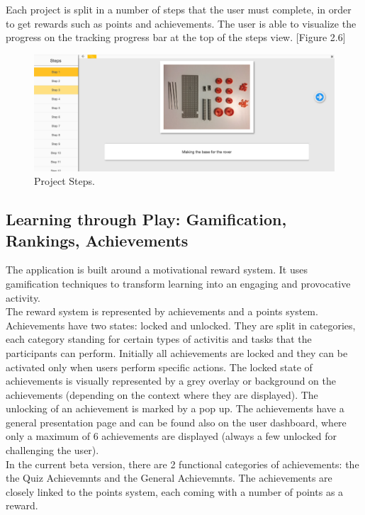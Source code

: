 Each project is split in a number of steps that the user must complete, in order to get rewards such as points and achievements. The user is able to visualize the progress on the tracking progress bar at the top of the steps view. [Figure 2.6] 

\begin{figure}
\includegraphics[width=1\linewidth]{images/ui/ProjectSteps.png}
\caption{Project Steps.}
\label{fig:project_steps}
\end{figure}


\subsection{Learning through Play: Gamification, Rankings, Achievements}

The application is built around a motivational reward system. It uses gamification techniques to transform learning into an engaging and provocative activity. \\

The reward system is represented by achievements and a points system. Achievements have two states: locked and unlocked. They are split in categories, each category standing for certain types of activitis and tasks that the participants can perform. Initially all achievements are locked and they can be activated only when users perform specific actions. The locked state of achievements is visually represented by a grey overlay or background on the achievements (depending on the context where they are displayed). The unlocking of an achievement is marked by a pop up. The achievements have a general presentation page and can be found also on the user dashboard, where only a maximum of 6 achievements are displayed (always a few unlocked for challenging the user).\\

In the current beta version, there are 2 functional categories of achievements: the the Quiz Achievemnts and the General Achievemnts. The achievements are closely linked to the points system, each coming with a number of points as a reward.\\


